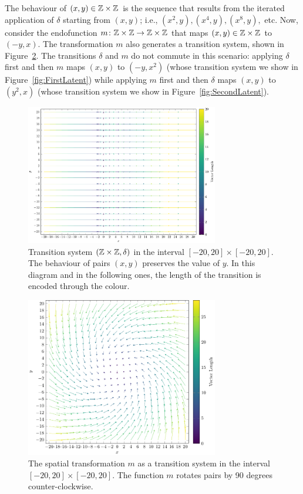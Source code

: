 The behaviour of $(x,y)\in \mathbb{Z}\times\mathbb{Z}$ is the sequence that results from the iterated application of $\delta$ starting from $(x,y)$; i.e., $(x^2,y),(x^4,y),(x^8,y),$ etc. Now, consider the endofunction $m\colon \mathbb{Z}\times\mathbb{Z}\rightarrow \mathbb{Z}\times\mathbb{Z}$ that maps $(x,y)\in \mathbb{Z}\times\mathbb{Z}$ to $(-y,x)$. The transformation $m$ also generates a transition system, shown in Figure~\ref{fig:SpatialDeformation}. The transitions $\delta$ and $m$ do not commute in this scenario: applying $\delta$ first and then $m$ maps $(x,y)$ %
to $(-y,x^2)$ (whose transition system we show in Figure~\ref{fig:FirstLatent}) while applying $m$ first and then $\delta$ maps $(x,y)$ to $(y^2,x)$ (whose transition system we show in Figure~\ref{fig:SecondLatent}). %
\begin{figure}[!t]
  \centering
  \includegraphics[width=0.75\textwidth]{Figures/VectorSpace1.pdf} 
  \caption{Transition system $(\mathbb{Z}\times\mathbb{Z}, \delta)$ in the interval $[-20,20]\times[-20,20]$. The behaviour of pairs $(x,y)$ preserves the value of $y$. In this diagram and in the following ones, the length of the transition is encoded through the colour.} 
  \label{fig:IntroVectorSpace}
\end{figure} 
\begin{figure}[!t]
  \centering
  \includegraphics[width=0.75\textwidth]{Figures/VectorSpace2.pdf} 
  \caption{The spatial transformation $m$ as a transition system in the interval $[-20,20]\times[-20,20]$. The function $m$ rotates pairs by 90 degrees counter-clockwise.} 
  \label{fig:SpatialDeformation} 
\end{figure} 

